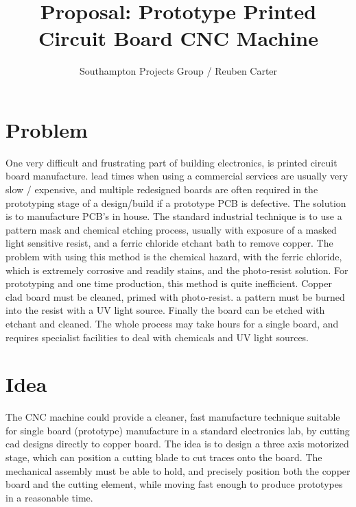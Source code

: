 \documentclass[a4paper]{article}
\begin{document}
\title{Proposal: Prototype Printed Circuit Board CNC Machine}
\author{Southampton Projects Group / Reuben Carter}
\maketitle

\section{Problem}

One very difficult and frustrating part of building electronics, is printed circuit board manufacture. lead times when using a commercial services
are usually very slow / expensive, and multiple redesigned boards are often required in the prototyping stage of a design/build if a prototype PCB 
is defective. The solution is to manufacture PCB's in house. The standard industrial technique is to use a pattern mask and chemical etching process, usually with
exposure of a masked light sensitive resist, and a ferric chloride etchant bath to remove copper. The problem with using this method is the chemical
hazard, with the ferric chloride, which is extremely corrosive and readily stains, and the photo-resist solution. For prototyping and one time production, 
this method is quite inefficient. Copper clad board must be cleaned, primed with photo-resist. a pattern must be burned into the resist with a UV light source.
Finally the board can be etched with etchant and cleaned. The whole process may take hours for a single board, and requires specialist facilities to deal with 
chemicals and UV light sources.

\section{Idea}

The CNC machine could provide a cleaner, fast manufacture technique suitable for single board (prototype) manufacture in a standard electronics lab, by cutting cad
designs directly to copper board. The idea is to design a three axis motorized stage, which can position a cutting blade to cut traces onto the board. 
The mechanical assembly must be able to hold, and precisely position both the copper board and the cutting element, while moving fast enough to produce 
prototypes in a reasonable time. 
\end{document}

